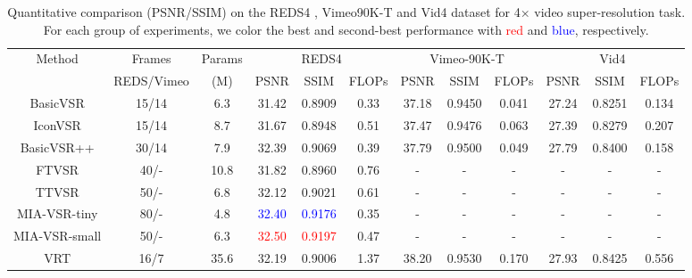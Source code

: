 \documentclass[10pt,twocolumn,letterpaper]{article}
\begin{document}
\begin{table*}[h]
	\renewcommand{\arraystretch}{0.8}
	\renewcommand{\tabcolsep}{3.2pt}
    \caption{Quantitative comparison (PSNR/SSIM) on the REDS4 \cite{nah2019ntire}, Vimeo90K-T \cite{xue2019video} and Vid4 \cite{liu2013bayesian} dataset for 4× video super-resolution task. For each group of experiments, we color the best and second-best performance with \textcolor{red}{red} and \textcolor{blue}{blue}, respectively.}
    \label{tab:moresota-table}
      \begin{threeparttable}
    \begin{adjustbox}{center}
    \centering
    \begin{tabular}{c|c|c||ccc|ccc|ccc}%
    \toprule
    \multirow{2}{*}{Method} & Frames&Params  & \multicolumn{3}{c}{REDS4} & \multicolumn{3}{c}{Vimeo-90K-T} & \multicolumn{3}{c}{Vid4}  \\
    & REDS/Vimeo&(M)& PSNR & SSIM&FLOPs & PSNR & SSIM&FLOPs & PSNR & SSIM&FLOPs    \\
    \midrule
    BasicVSR \cite{chan2020basicvsr}     & 15/14& 6.3 & 31.42 & 0.8909& 0.33& 37.18 & 0.9450& 0.041 & 27.24 & 0.8251&0.134\\
    IconVSR \cite{chan2020basicvsr}      & 15/14& 8.7  & 31.67 & 0.8948& 0.51& 37.47 & 0.9476& 0.063 & 27.39 & 0.8279&0.207\\
    BasicVSR++ \cite{chan2022basicvsr++} & 30/14&7.9  & 32.39 & 0.9069& 0.39& 37.79 & 0.9500& 0.049 & 27.79 & 0.8400&0.158 \\
    \midrule
    \midrule
    FTVSR \cite{qiu2022learning} & 40/- & 10.8 & 31.82& 0.8960 & 0.76&-&-&-&-&-&- \\
    TTVSR \cite{liu2022learning}&50/-& 6.8 &32.12&0.9021&0.61&-&-&-&-&-&-\\
    \rowcolor{gray!20}
    MIA-VSR-tiny & 80/-& 4.8 & \textcolor{blue}{32.40} & \textcolor{blue}{0.9176} & 0.35& - & -& -& -& -& -  \\
    \rowcolor{gray!20}
    MIA-VSR-small & 50/-& 6.3 & \textcolor{red}{32.50} & \textcolor{red}{0.9197} & 0.47 & - & -& -& -& -& -  \\
    \midrule
    VRT \cite{liang2022vrt}  & 16/7& 35.6 & 32.19 & 0.9006& 1.37& 38.20 & 0.9530& 0.170 & 27.93 & 0.8425&0.556\\

\end{tabular}
\end{adjustbox}
\end{threeparttable}
\end{table*}
\end{document}
